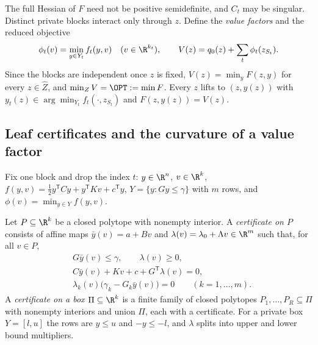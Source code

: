 The full Hessian of $F$ need not be positive semidefinite, and $C_t$ may be
singular. Distinct private blocks interact only through $z$. Define the
\emph{value factors} and the reduced objective
\begin{equation}\label{eq:cr-value}
\phi_t(v)=\min_{y\in Y_t}f_t(y,v)\quad(v\in\R^{k_t}),\qquad
V(z)=q_0(z)+\sum_t\phi_t(z_{S_t}).
\end{equation}
Since the blocks are independent once $z$ is fixed,
$V(z)=\min_yF(z,y)$ for every $z\in\widehat Z$, and $\min_ZV=\OPT:=\min F$.
Every $z$ lifts to $(z,y(z))$ with $y_t(z)\in\arg\min_{Y_t}f_t(\cdot,z_{S_t})$
and $F(z,y(z))=V(z)$.

\subsection{Leaf certificates and the curvature of a value factor}

Fix one block and drop the index $t$: $y\in\R^n$, $v\in\R^k$,
$f(y,v)=\frac12y^{\mathsf T}Cy+y^{\mathsf T}Kv+c^{\mathsf T}y$,
$Y=\{y:Gy\le\gamma\}$ with $m$ rows, and $\phi(v)=\min_{y\in Y}f(y,v)$.

\begin{definition}\label{def:leaf}
Let $P\subseteq\R^k$ be a closed polytope with nonempty interior. A
\emph{certificate on $P$} consists of affine maps $\bar y(v)=a+Bv$ and
$\lambda(v)=\lambda_0+\Lambda v\in\R^m$ such that, for all $v\in P$,
\begin{align}
&G\bar y(v)\le\gamma,\qquad \lambda(v)\ge0,\label{eq:leaf-feas}\\
&C\bar y(v)+Kv+c+G^{\mathsf T}\lambda(v)=0,\label{eq:leaf-stat}\\
&\lambda_k(v)\bigl(\gamma_k-G_k\bar y(v)\bigr)=0\qquad(k=1,\ldots,m).\label{eq:leaf-comp}
\end{align}
A \emph{certificate on a box $\Pi\subseteq\R^k$} is a finite family of closed
polytopes $P_1,\ldots,P_R\subseteq\Pi$ with nonempty interiors and union $\Pi$,
each with a certificate. For a private box $Y=[l,u]$ the rows are
$y\le u$ and $-y\le-l$, and $\lambda$ splits into upper and lower bound
multipliers.
\end{definition}

